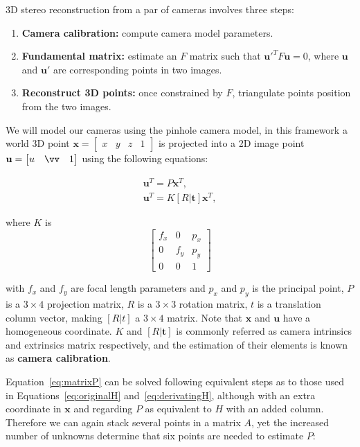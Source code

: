 \documentclass[12pt]{article}
\begin{document}
3D stereo reconstruction from a par of cameras involves three steps:
\begin{enumerate}
\item \textbf{Camera calibration:} compute camera model parameters.
\item \textbf{Fundamental matrix:} estimate an $F$ matrix such that $\mathbf{u}'^TF\mathbf{u} = 0$, where $\mathbf{u}$ and $\mathbf{u}'$ are corresponding points in two images.
\item \textbf{Reconstruct 3D points:} once constrained by $F$, triangulate points position from the two images.
\end{enumerate}

We will model our cameras using the pinhole camera model, in this framework a world 3D point $\mathbf{x} = \begin{bmatrix} x & y & z & 1 \end{bmatrix}$ is projected into a 2D image point $\mathbf{u} = \begin{bmatrix} u & \vv & 1 \end{bmatrix}$ using the following equations:

\begin{gather}
	\mathbf{u}^T = P \mathbf{x}^T, \label{eq:matrixP} \\
	\mathbf{u}^T = K [R | \mathbf{t}] \mathbf{x}^T, \label{eq:matrixRT}
\end{gather}

where $K$ is 
\begin{equation}
\begin{bmatrix}
f_x & 0 & p_x \\ 
0 & f_y & p_y \\ 
0 & 0 & 1
\end{bmatrix}
\end{equation}

with $f_x$ and $f_y$ are focal length parameters and $p_x$ and $p_y$ is the principal point, $P$ is a $3 \times 4$ projection matrix, $R$ is a $3 \times 3$ rotation matrix, $t$ is a translation column vector, making $[R|t]$ a $3 \times 4$ matrix.
Note that $\mathbf{x}$ and $\mathbf{u}$ have a homogeneous coordinate.
$K$ and $[R|\mathbf{t}]$ is commonly referred as camera intrinsics and extrinsics matrix respectively, and the estimation of their elements is known as \textbf{camera calibration}.

Equation~\ref{eq:matrixP} can be solved following equivalent steps as to those used in Equations~\ref{eq:originalH} and~\ref{eq:derivatingH}, although with an extra coordinate in $\mathbf{x}$ and regarding $P$ as equivalent to $H$ with an added column.
Therefore we can again stack several points in a matrix $A$, yet the increased number of unknowns determine that six points are needed to estimate $P$:
\end{document}
